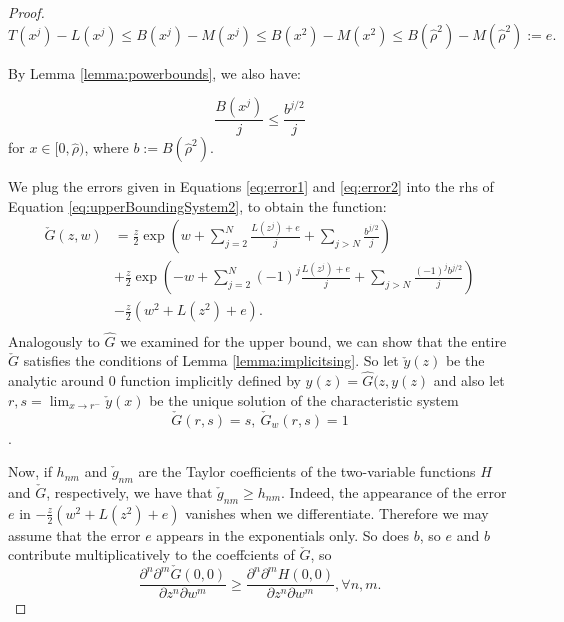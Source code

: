 \documentclass{amsart}
\theoremstyle{plain}
\newcommand{\nicetrees}{T}
\newcommand{\LG}{\check{G}}
\begin{document}
\begin{proof}
\begin{equation}\label{eq:error1}
	\nicetrees(x^j) - L(x^j) \leq B(x^j) - M(x^j)  \leq B(x^2) - M(x^2) \leq B(\hat{\rho}^2) -M(\hat{\rho}^2) :=e.
	\end{equation}

 By Lemma \ref{lemma:powerbounds},  we also have:

\begin{equation}\label{eq:error2}
     \frac{B(x^j)}{j} \leq  \frac{b^{j/2}}{j}
   \end{equation}
for $x \in [0,\hat{\rho})$, where $b := B(\hat{\rho}^2)$. 


We plug the errors given in  Equations \eqref{eq:error1} and \eqref{eq:error2} into the rhs of Equation \eqref{eq:upperBoundingSystem2}, to obtain the function:
\begin{equation}\label{eq:Gcheck}
\begin{split}
    \LG(z,w) &=  \frac{z}{2} 
        \exp\left( w + \sum\limits_{j = 2}^{N} \frac{L(z^j) +e}{j}
        + \sum\limits_{j > N} \frac{b^{j/2}}{j} \right)  \\ 
      &+\frac{z}{2}\exp\left(-w + \sum\limits_{j = 2}^{N} (-1)^j \frac{L(z^j) +e}{j} 
      + \sum\limits_{j > N} \frac{(-1)^j b^{j/2}}{j} \right) \\
      &-\frac{z}{2}\left(w^2 + L(z^2) +e\right).\\  
    \end{split}
 \end{equation} 
 Analogously to $\hat{G}$ we examined for the upper bound, we can show that the  entire $\check{G}$  satisfies  the conditions of Lemma \ref{lemma:implicitsing}. So let $\check{y}(z)$ be the analytic around 0 function implicitly defined by  $y(z) = \hat{G}(z, y(z)$ and also let $r,s = \lim_{x\rightarrow r^{-}}\check{y}(x)$ be the unique solution of the characteristic system $$\check{G}(r,s)=s, \ \check{G}_w(r,s) =1$$. 
 
 
 
 Now, if $h_{nm}$ and $\check{g}_{nm}$  are the Taylor coefficients of the two-variable functions 
  $H$ and   $\check{G}$, respectively, 
 we have that $\check{g}_{nm} \geq   h_{nm} $. Indeed, the appearance of  the error $e$ in $-\frac{z}{2}\left(w^2 + L(z^2) +e\right)$ vanishes when we differentiate. Therefore we may assume that the error $e$ appears in the exponentials only. So does $b$,  so $e$ and $b$  contribute multiplicatively to the coeffcients of $\check{G}$, so  $$\frac{\partial^n \partial^m \check{G}(0,0)}{\partial z^n \partial w^m} \geq \frac{\partial^n \partial^m H(0,0)}{\partial z^n \partial w^m}, \forall n, m.   $$
   

\end{proof}
\end{document}
